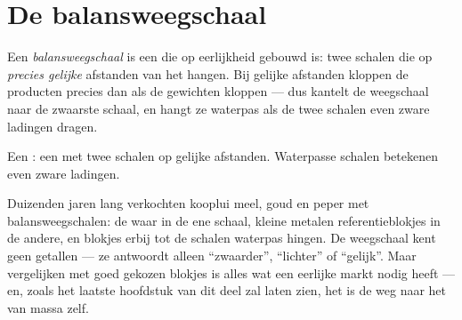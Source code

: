 \section{De balansweegschaal}

\begin{definition}[Balansweegschaal]\label{def:g3:levers-and-scales:scale}
Een \emph{balansweegschaal} is een
 die op eerlijkheid gebouwd is: twee schalen die op
\emph{precies gelijke} afstanden van het  hangen. Bij
gelijke afstanden kloppen de producten precies dan als de gewichten
kloppen --- dus kantelt de weegschaal naar de zwaarste schaal, en
hangt ze waterpas als de twee schalen even zware ladingen dragen.
\end{definition}

\begin{omfigure}

{\small Een : een  met twee schalen op gelijke
afstanden. Waterpasse schalen betekenen even zware ladingen.}
\end{omfigure}

\begin{example}\label{ex:g3:levers-and-scales:weighing}
Duizenden jaren lang verkochten kooplui meel, goud en peper met
balansweegschalen: de waar in de ene schaal, kleine metalen
referentieblokjes in de andere, en blokjes erbij tot de schalen
waterpas hingen. De weegschaal kent geen getallen --- ze antwoordt
alleen ``zwaarder'', ``lichter'' of ``gelijk''. Maar vergelijken met
goed gekozen blokjes is alles wat een eerlijke markt nodig heeft ---
en, zoals het laatste hoofdstuk van dit deel zal laten zien, het is de
weg naar het  van massa zelf.
\end{example}

